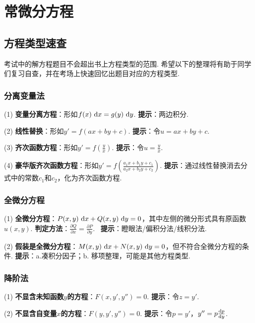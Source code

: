 \clearpage
\section{常微分方程}

\subsection{方程类型速查}

考试中的解方程题目不会超出书上方程类型的范围.
希望以下的整理将有助于同学们复习自查，并在考场上快速回忆出题目对应的方程类型.

\subsubsection{分离变量法}

(1) \textbf{变量分离方程}：形如$f(x) ~\mathrm{d} x = g(y)~\mathrm{d} y$. \textbf{提示}：两边积分.

(2) \textbf{线性替换}：形如$y' = f(ax+by+c)$. \textbf{提示}：令$u = ax+by+c$.

(3) \textbf{齐次函数方程}：形如$y' = f \left( \frac{y}{x} \right)$. \textbf{提示}：令$u= \frac{y}{x}$.

(4) \textbf{豪华版齐次函数方程}：形如$y' = f \left( \frac{a_1 x+ b_1 y + c_1}{a_2 x + b_2 y + c_2} \right)$.
\textbf{提示}：通过线性替换消去分式中的常数$c_1$和$c_2$，化为齐次函数方程.

\subsubsection{全微分方程}

(1) \textbf{全微分方程}：$P(x,y)~\mathrm{d} x + Q(x,y)~\mathrm{d} y =0$，其中左侧的微分形式具有原函数$u(x,y)$.
\textbf{判定方法}：$\frac{\partial Q}{\partial x} = \frac{\partial P}{\partial y}$.
~\textbf{提示}：瞪眼法/偏积分法/线积分法. \vspace{0.25em}

(2) \textbf{假装是全微分方程}：$M(x,y)~\mathrm{d} x + N(x,y)~\mathrm{d} y = 0$，但不符合全微分方程的条件.
\textbf{提示}：a.凑积分因子；b. 移项整理，可能是其他方程类型.

\subsubsection{降阶法}

(1) \textbf{不显含未知函数$y$的方程}：$F(x,y',y'')=0$.
\textbf{提示}：令$z = y'$.

(2) \textbf{不显含自变量$x$的方程}：$F(y,y',y'')=0$.
\textbf{提示}：令$p = y'$，$y'' = p \frac{\mathrm{d} p}{\mathrm{d} y}$.


